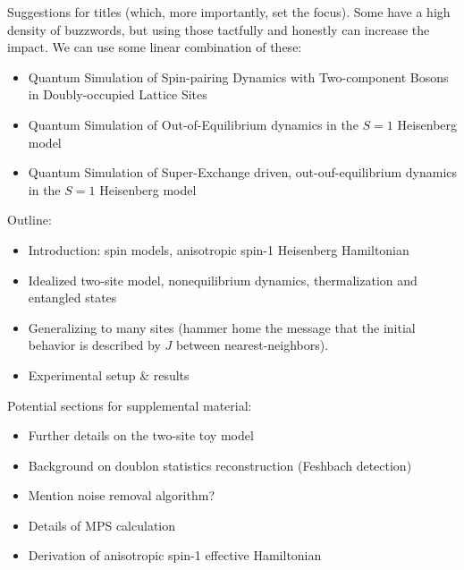\documentclass[aps,prl,twocolumn,superscriptaddress]{revtex4-1}
\begin{document}
\clearpage
\onecolumngrid
{}

Suggestions for titles (which, more importantly, set the focus). Some have a high density of buzzwords, but using those tactfully and honestly can increase the impact. We can use some linear combination of these:
\begin{itemize}
    \item Quantum Simulation of Spin-pairing Dynamics with Two-component Bosons in Doubly-occupied Lattice Sites
    \item Quantum Simulation of Out-of-Equilibrium dynamics in the $S = 1$ Heisenberg model
    \item Quantum Simulation of Super-Exchange driven, out-ouf-equilibrium dynamics in the $S = 1$ Heisenberg model
\end{itemize}

Outline:
\begin{itemize}
    \item Introduction: spin models, anisotropic spin-1 Heisenberg Hamiltonian
    \item Idealized two-site model, nonequilibrium dynamics, thermalization and entangled states
    \item Generalizing to many sites (hammer home the message that the initial behavior is described by $J$ between nearest-neighbors).
    \item Experimental setup \& results
\end{itemize}

Potential sections for supplemental material:
\begin{itemize}
    \item Further details on the two-site toy model
    \item Background on doublon statistics reconstruction (Feshbach detection)
    \item Mention noise removal algorithm?
    \item Details of MPS calculation
    \item Derivation of anisotropic spin-1 effective Hamiltonian
\end{itemize}
\end{document}
